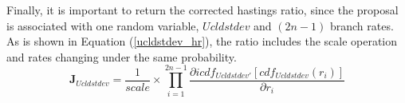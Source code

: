 \documentclass{bmcart}
\begin{document}
\begin{backmatter}
Finally, it is important to return the corrected hastings ratio, since the proposal is associated with one random variable, $Ucldstdev$ and $(2n-1)$ branch rates. As is shown in Equation (\ref{ucldstdev_hr}), the ratio includes the scale operation and rates changing under the same probability.
\begin{equation}\label{ucldstdev_hr}
{{\mathbf{J}}_{Ucldstdev}} = \frac{1}{{scale}} \times \prod\limits_{i = 1}^{2n - 1} {\frac{{\partial icd{f_{Ucldstdev'}}[cd{f_{Ucldstdev}}({r_i})]}}{{\partial {r_i}}}}
\end{equation}


\end{backmatter}
\end{document}
